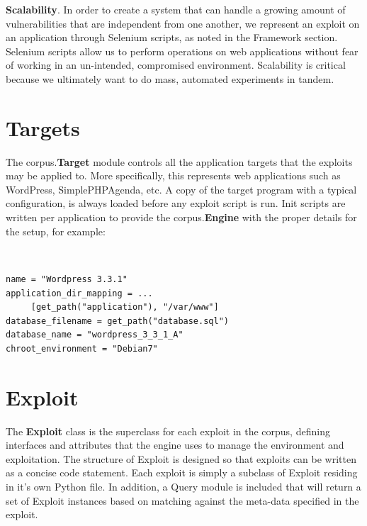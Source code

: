 \documentclass[letterpaper,twocolumn,10pt]{article}
\begin{document}
{\bf Scalability}.  In order to create a system that can handle a growing amount of vulnerabilities that are independent from one another, we represent an exploit on an application through  Selenium scripts, as noted in the Framework section.  Selenium scripts allow us to perform operations on web applications without fear of working in an un-intended, compromised environment.  Scalability is critical because we ultimately want to do mass, automated experiments in tandem. \\




\section{Targets}

   The corpus.{\bf Target} module controls all the application targets that the exploits may be applied to.  More specifically, this represents web applications such as WordPress, SimplePHPAgenda, etc. A copy of the target program with a typical configuration, is always loaded before any exploit script is run.  Init scripts are written per application to provide the corpus.{\bf Engine} with the proper details for the setup, for example:

\begin{minipage}{\textwidth}
{\tt \footnotesize
\begin{lstlisting}
name = "Wordpress 3.3.1"
application_dir_mapping = ...
     [get_path("application"), "/var/www"]
database_filename = get_path("database.sql")
database_name = "wordpress_3_3_1_A"
chroot_environment = "Debian7"
\end{lstlisting}
} 
\end{minipage}


\section{Exploit}
The {\bf Exploit} class is the superclass for each exploit in the corpus, defining interfaces and attributes that the engine uses to manage the environment and exploitation. The structure of Exploit is designed so that exploits can be written as a concise code statement. Each exploit is simply a subclass of Exploit residing in it's own Python file. 
 In addition, a Query module is included that will return a set of Exploit instances based on matching against the meta-data specified in the exploit.\par
\end{document}
